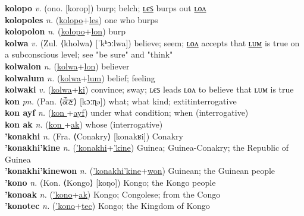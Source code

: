\textbf{kolopo} \textit{v.} (ono. [korop])
burp; belch; \hyperref[kolopoles]{ʟєꜱ} burps out \hyperref[kolopolon]{ʟᴏᴧ} \label{kolopo} \\
\textbf{kolopoles} \textit{n.} (\hyperref[kolopo]{kolopo}+\hyperref[les]{les})
one who burps \label{kolopoles} \\
\textbf{kolopolon} \textit{n.} (\hyperref[kolopo]{kolopo}+\hyperref[lon]{lon})
burp \label{kolopolon} \\
\textbf{kolwa} \textit{v.} (Zul. ⟨kholwa⟩ [ˈkʰɔːlwa])
believe; seem; \hyperref[kolwalon]{ʟᴏᴧ} accepts that \hyperref[kolwalum]{ʟᴜᴍ} is true on a subconscious level; see "be sure" and "think" \label{kolwa} \\
\textbf{kolwalon} \textit{n.} (\hyperref[kolwa]{kolwa}+\hyperref[lon]{lon})
believer \label{kolwalon} \\
\textbf{kolwalum} \textit{n.} (\hyperref[kolwa]{kolwa}+\hyperref[lum]{lum})
belief; feeling \label{kolwalum} \\
\textbf{kolwaki} \textit{v.} (\hyperref[kolwa]{kolwa}+\hyperref[ki]{ki})
convince; sway; ʟєꜱ leads ʟᴏᴧ to believe that ʟᴜᴍ is true \label{kolwaki} \\
\textbf{kon} \textit{pn.} (Pan. ⟨ਕੌਣ⟩ [kɔːɳə])
what; what kind; 	extit{interrogative} \label{kon} \\
\textbf{kon ayf} \textit{n.} (\hyperref[kon ]{kon }+\hyperref[yf]{ayf})
under what condition; when (interrogative) \label{kon ayf} \\
\textbf{kon ak} \textit{n.} (\hyperref[kon ]{kon }+\hyperref[k]{ak})
whose (interrogative) \label{kon ak} \\
\textbf{'konakhi} \textit{n.} (Fra. ⟨Conakry⟩ [konakʁi])
Conakry \label{'konakhi} \\
\textbf{'konakhi'kine} \textit{n.} (\hyperref['konakhi]{'konakhi}+\hyperref['kine]{'kine})
Guinea; Guinea-Conakry; the Republic of Guinea \label{'konakhi'kine} \\
\textbf{'konakhi'kinewon} \textit{n.} (\hyperref['konakhi'kine]{'konakhi'kine}+\hyperref[won]{won})
Guinean; the Guinean people \label{'konakhi'kinewon} \\
\textbf{'kono} \textit{n.} (Kon. ⟨Kongo⟩ [koŋo])
Kongo; the Kongo people \label{'kono} \\
\textbf{'konoak} \textit{n.} (\hyperref['kono]{'kono}+\hyperref[ak]{ak})
Kongo; Congolese; from the Congo \label{'konoak} \\
\textbf{'konotec} \textit{n.} (\hyperref['kono]{'kono}+\hyperref[tec]{tec})
Kongo; the Kingdom of Kongo \label{'konotec} \\
